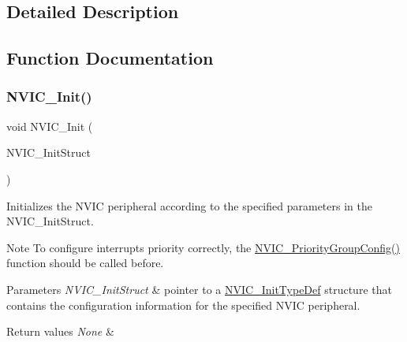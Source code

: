 \subsection{Detailed Description}


\subsection{Function Documentation}
\mbox{\label{group___m_i_s_c___private___functions_ga4ab373ed0870c06fca5eb51d639adf41}} 
\subsubsection{\texorpdfstring{N\+V\+I\+C\+\_\+\+Init()}{NVIC\_Init()}}
{\footnotesize\ttfamily void N\+V\+I\+C\+\_\+\+Init (\begin{DoxyParamCaption}\item[{\mbox{\hyperlink{struct_n_v_i_c___init_type_def}{N\+V\+I\+C\+\_\+\+Init\+Type\+Def}} $\ast$}]{N\+V\+I\+C\+\_\+\+Init\+Struct }\end{DoxyParamCaption})}



Initializes the N\+V\+IC peripheral according to the specified parameters in the N\+V\+I\+C\+\_\+\+Init\+Struct. 

\begin{DoxyNote}{Note}
To configure interrupts priority correctly, the \mbox{\hyperlink{group___m_i_s_c___private___functions_gadfb1f34f803ce54c976643db8c484442}{N\+V\+I\+C\+\_\+\+Priority\+Group\+Config()}} function should be called before. 
\end{DoxyNote}

\begin{DoxyParams}{Parameters}
{\em N\+V\+I\+C\+\_\+\+Init\+Struct} & pointer to a \mbox{\hyperlink{struct_n_v_i_c___init_type_def}{N\+V\+I\+C\+\_\+\+Init\+Type\+Def}} structure that contains the configuration information for the specified N\+V\+IC peripheral. \\
\hline
\end{DoxyParams}

\begin{DoxyRetVals}{Return values}
{\em None} & \\
\hline
\end{DoxyRetVals}
\mbox{\label{group___m_i_s_c___private___functions_gadfb1f34f803ce54c976643db8c484442}} 
